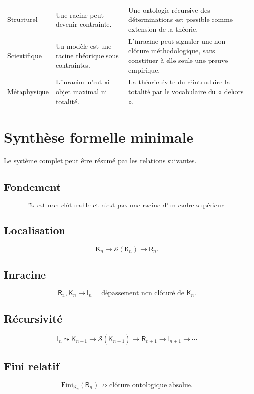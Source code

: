 \documentclass[11pt,a4paper]{article}
\newcommand{\Rac}{\mathsf{R}}
\newcommand{\Inrac}{\mathsf{I}}
\newcommand{\Cadre}{\mathsf{K}}
\newcommand{\Sol}{\mathcal{S}}
\newcommand{\nextlev}{\leadsto}
\begin{document}
\begin{longtable}{>{\raggedright\arraybackslash}p{}
                  >{\raggedright\arraybackslash}p{}
                  >{\raggedright\arraybackslash}p{}}
Structurel & Une racine peut devenir contrainte. & Une ontologie récursive des déterminations est possible comme extension de la théorie.\\
Scientifique & Un modèle est une racine théorique sous contraintes. & L'inracine peut signaler une non-clôture méthodologique, sans constituer à elle seule une preuve empirique.\\
Métaphysique & L'inracine n'est ni objet maximal ni totalité. & La théorie évite de réintroduire la totalité par le vocabulaire du « dehors ».\\
\bottomrule
\end{longtable}

\section{Synthèse formelle minimale}

Le système complet peut être résumé par les relations suivantes.

\subsection*{Fondement}
\[
\boxed{
\mathfrak I_\ast
\text{ est non clôturable et n'est pas une racine d'un cadre supérieur.}
}
\]

\subsection*{Localisation}
\[
\boxed{
\Cadre_n
\to
\Sol(\Cadre_n)
\to
\Rac_n.
}
\]

\subsection*{Inracine}
\[
\boxed{
\Rac_n,\Cadre_n
\to
\Inrac_n
=
\text{dépassement non clôturé de }\Cadre_n.
}
\]

\subsection*{Récursivité}
\[
\boxed{
\Inrac_n
\nextlev
\Cadre_{n+1}
\to
\Sol(\Cadre_{n+1})
\to
\Rac_{n+1}
\to
\Inrac_{n+1}
\to\cdots
}
\]

\subsection*{Fini relatif}
\[
\boxed{
\mathrm{Fini}_{\Cadre_n}(\Rac_n)
\not\Rightarrow
\text{clôture ontologique absolue}.
}
\]
\end{document}
